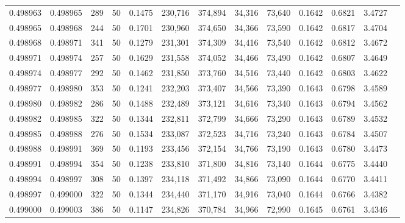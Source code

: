 \begin{tabular}{rrrrrrrrrrrrr}
0.498963 & 0.498965 & 289 &  50 &                                     0.1475 & 230,716 & 374,894 &  34,316 &  73,640 & 0.1642 & 0.6821 & 3.4727 \\
0.498965 & 0.498968 & 244 &  50 &                                     0.1701 & 230,960 & 374,650 &  34,366 &  73,590 & 0.1642 & 0.6817 & 3.4704 \\
0.498968 & 0.498971 & 341 &  50 &                                     0.1279 & 231,301 & 374,309 &  34,416 &  73,540 & 0.1642 & 0.6812 & 3.4672 \\
0.498971 & 0.498974 & 257 &  50 &                                     0.1629 & 231,558 & 374,052 &  34,466 &  73,490 & 0.1642 & 0.6807 & 3.4649 \\
0.498974 & 0.498977 & 292 &  50 &                                     0.1462 & 231,850 & 373,760 &  34,516 &  73,440 & 0.1642 & 0.6803 & 3.4622 \\
0.498977 & 0.498980 & 353 &  50 &                                     0.1241 & 232,203 & 373,407 &  34,566 &  73,390 & 0.1643 & 0.6798 & 3.4589 \\
0.498980 & 0.498982 & 286 &  50 &                                     0.1488 & 232,489 & 373,121 &  34,616 &  73,340 & 0.1643 & 0.6794 & 3.4562 \\
0.498982 & 0.498985 & 322 &  50 &                                     0.1344 & 232,811 & 372,799 &  34,666 &  73,290 & 0.1643 & 0.6789 & 3.4532 \\
0.498985 & 0.498988 & 276 &  50 &                                     0.1534 & 233,087 & 372,523 &  34,716 &  73,240 & 0.1643 & 0.6784 & 3.4507 \\
0.498988 & 0.498991 & 369 &  50 &                                     0.1193 & 233,456 & 372,154 &  34,766 &  73,190 & 0.1643 & 0.6780 & 3.4473 \\
0.498991 & 0.498994 & 354 &  50 &                                     0.1238 & 233,810 & 371,800 &  34,816 &  73,140 & 0.1644 & 0.6775 & 3.4440 \\
0.498994 & 0.498997 & 308 &  50 &                                     0.1397 & 234,118 & 371,492 &  34,866 &  73,090 & 0.1644 & 0.6770 & 3.4411 \\
0.498997 & 0.499000 & 322 &  50 &                                     0.1344 & 234,440 & 371,170 &  34,916 &  73,040 & 0.1644 & 0.6766 & 3.4382 \\
0.499000 & 0.499003 & 386 &  50 &                                     0.1147 & 234,826 & 370,784 &  34,966 &  72,990 & 0.1645 & 0.6761 & 3.4346 \\

\end{tabular}
